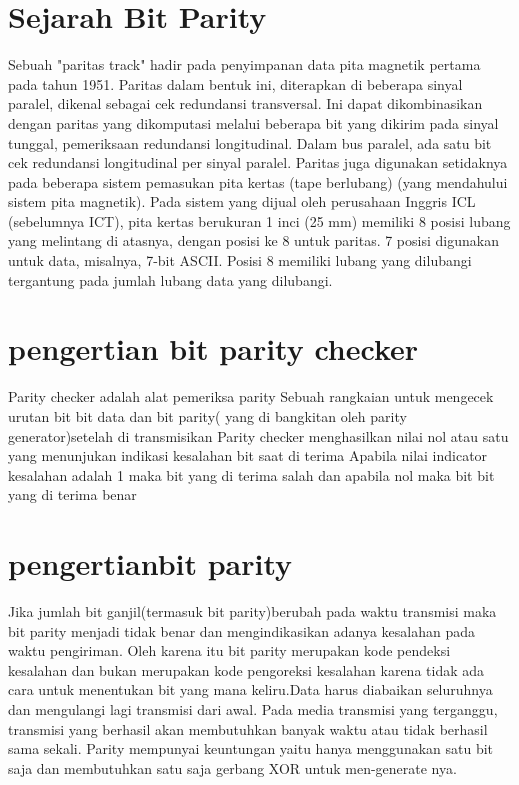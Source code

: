 \section{Sejarah Bit Parity}
Sebuah "paritas track" hadir pada penyimpanan data pita magnetik pertama pada tahun 1951. Paritas dalam bentuk ini, diterapkan di beberapa sinyal paralel, dikenal sebagai cek redundansi transversal. Ini dapat dikombinasikan dengan paritas yang dikomputasi melalui beberapa bit yang dikirim pada sinyal tunggal, pemeriksaan redundansi longitudinal. Dalam bus paralel, ada satu bit cek redundansi longitudinal per sinyal paralel.
Paritas juga digunakan setidaknya pada beberapa sistem pemasukan pita kertas (tape berlubang) (yang mendahului sistem pita magnetik). Pada sistem yang dijual oleh perusahaan Inggris ICL (sebelumnya ICT), pita kertas berukuran 1 inci (25 mm) memiliki 8 posisi lubang yang melintang di atasnya, dengan posisi ke 8 untuk paritas. 7 posisi digunakan untuk data, misalnya, 7-bit ASCII. Posisi 8 memiliki lubang yang dilubangi tergantung pada jumlah lubang data yang dilubangi.

\section{pengertian bit parity checker}
Parity checker adalah alat pemeriksa parity
Sebuah rangkaian untuk mengecek urutan bit bit data dan bit parity( yang di bangkitan  oleh parity generator)setelah di transmisikan
Parity checker menghasilkan nilai nol atau satu yang menunjukan indikasi kesalahan bit saat di terima
Apabila nilai indicator  kesalahan adalah 1 maka bit yang di terima salah dan apabila nol maka bit bit yang di terima benar

\section{pengertianbit parity}
Jika jumlah bit ganjil(termasuk bit parity)berubah pada waktu transmisi maka bit parity menjadi tidak benar dan mengindikasikan adanya kesalahan pada waktu pengiriman. Oleh karena itu bit parity merupakan kode pendeksi kesalahan dan bukan merupakan kode pengoreksi kesalahan karena tidak ada cara untuk menentukan bit yang mana keliru.Data harus diabaikan seluruhnya dan mengulangi lagi transmisi dari awal. Pada media transmisi yang terganggu, transmisi yang berhasil akan membutuhkan banyak waktu atau tidak berhasil sama sekali. Parity mempunyai keuntungan yaitu hanya menggunakan satu bit saja dan membutuhkan satu saja gerbang XOR untuk men-generate nya.